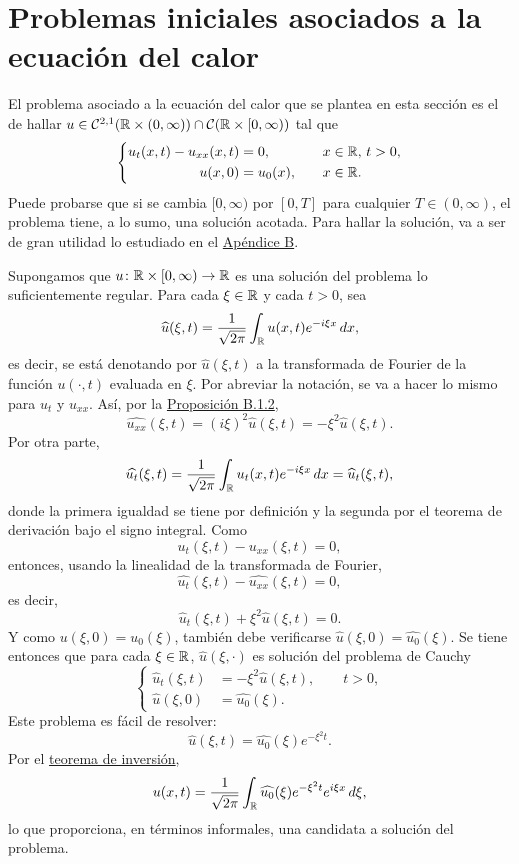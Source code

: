 \documentclass[a4paper, 12pt, extrafontsizes]{memoir}
\begin{document}
\section{Problemas iniciales asociados a la ecuación del calor}

El problema asociado a la ecuación del calor que se plantea en esta sección es el de hallar $u \in \mathcal{C}^{2,1}(\mathbb R \times (0,\infty)) \cap \mathcal{C}(\mathbb R \times [0,\infty))$ tal que
\[
    \left\{\begin{alignedat}{5}
        u_{t}(x,t)-u_{xx}(x,t) &= 0, \qquad & x &\in \R, \ & t &>0, \\
        u(x,0) &= u_0(x), \qquad & x &\in \R. & & \\
    \end{alignedat}\right.
\]
Puede probarse que si se cambia $[0,\infty)$ por $[0,T]$ para cualquier $T \in (0,\infty)$, el problema tiene, a lo sumo, una solución acotada. Para hallar la solución, va a ser de gran utilidad lo estudiado en el \hyperref[B]{\color{gray}Apéndice B}.

Supongamos que $u \colon \mathbb R \times [0,\infty) \to \mathbb R$ es una solución del problema lo suficientemente regular. Para cada $\xi \in \mathbb R$ y cada $t > 0$, sea
\[\widehat{u}(\xi,t) = \frac{1}{\sqrt{2\pi}}\int_\mathbb R u(x,t)e^{-i\xi x} \, dx,\]
es decir, se está denotando por $\widehat{u}(\xi,t)$ a la transformada de Fourier de la función $u(\cdot, t)$ evaluada en $\xi$. Por abreviar la notación, se va a hacer lo mismo para $u_t$ y $u_{xx}$. Así, por la \hyperref[pro:B.1.2]{\color{gray}Proposición B.1.2},
\[\widehat{u_{xx}}(\xi,t) = (i\xi)^2\widehat{u}(\xi,t) = -\xi^2 \widehat{u}(\xi,t).\]
Por otra parte,
\[\widehat{u_t}(\xi,t)= \frac{1}{\sqrt{2\pi}}\int_\mathbb R u_t(x,t) e^{-i\xi x} \, dx = \widehat{u}_t(\xi,t),\]
donde la primera igualdad se tiene por definición y la segunda por el teorema de derivación bajo el signo integral. Como
\[u_t(\xi,t)-u_{xx}(\xi,t)=0,\]
entonces, usando la linealidad de la transformada de Fourier,
\[\widehat{u_t}(\xi,t) -\widehat{u_{xx}}(\xi,t) = 0,\]
es decir,
\[\widehat{u}_t(\xi,t) +\xi^2\widehat{u}(\xi,t) = 0.\]
Y como $u(\xi,0) = u_0(\xi)$, también debe verificarse $\widehat{u}(\xi,0) = \widehat{u_0}(\xi)$. Se tiene entonces que para cada $\xi \in \mathbb R$, $\widehat{u}(\xi,\cdot)$ es solución del problema de Cauchy
\[\left\{\begin{alignedat}{2}
    \widehat{u}_t(\xi,t) &= -\xi^2 \widehat{u}(\xi,t), \qquad t > 0, \\
    \widehat{u}(\xi,0) &= \widehat{u_0}(\xi).
\end{alignedat}\right.\]
Este problema es fácil de resolver: \[\widehat{u}(\xi,t) = \widehat{u_0}(\xi)e^{-\xi^2t}. \tag{$\ast$}\]
Por el \hyperref[teo:B.4.1]{\color{gray}teorema de inversión},
\[u(x,t) =\frac{1}{\sqrt{2\pi}} \int_\mathbb R \widehat{u_0}(\xi)e^{-\xi^2t}e^{i\xi x} \, d\xi,\]
lo que proporciona, en términos informales, una candidata a solución del problema. 
\end{document}

